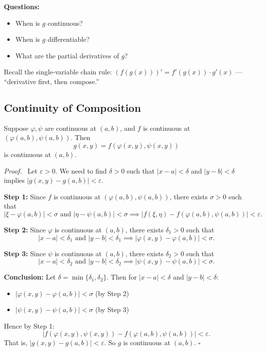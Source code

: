 \documentclass[11pt]{report}
\renewenvironment{proof}[1][Proof]{\par\noindent\textit{#1.}\ }{\hfill$\square$\par\medskip}
\begin{document}
\textbf{Questions:}
\begin{itemize}[itemsep=2pt]
    \item When is $g$ continuous?
    \item When is $g$ differentiable?
    \item What are the partial derivatives of $g$?
\end{itemize}

Recall the single-variable chain rule: $(f(g(x)))' = f'(g(x)) \cdot g'(x)$ — ``derivative first, then compose.''

\subsection*{Continuity of Composition}

\begin{theorem}
Suppose $\varphi, \psi$ are continuous at $(a, b)$, and $f$ is continuous at $(\varphi(a,b), \psi(a,b))$. Then 
\[
g(x,y) = f(\varphi(x,y), \psi(x,y))
\]
is continuous at $(a, b)$.
\end{theorem}

\begin{proof}
Let $\varepsilon > 0$. We need to find $\delta > 0$ such that $|x - a| < \delta$ and $|y - b| < \delta$ implies $|g(x,y) - g(a,b)| < \varepsilon$.

\textbf{Step 1:} Since $f$ is continuous at $(\varphi(a,b), \psi(a,b))$, there exists $\sigma > 0$ such that
\[
|\xi - \varphi(a,b)| < \sigma \text{ and } |\eta - \psi(a,b)| < \sigma \implies |f(\xi, \eta) - f(\varphi(a,b), \psi(a,b))| < \varepsilon.
\]

\textbf{Step 2:} Since $\varphi$ is continuous at $(a,b)$, there exists $\delta_1 > 0$ such that
\[
|x - a| < \delta_1 \text{ and } |y - b| < \delta_1 \implies |\varphi(x,y) - \varphi(a,b)| < \sigma.
\]

\textbf{Step 3:} Since $\psi$ is continuous at $(a,b)$, there exists $\delta_2 > 0$ such that
\[
|x - a| < \delta_2 \text{ and } |y - b| < \delta_2 \implies |\psi(x,y) - \psi(a,b)| < \sigma.
\]

\textbf{Conclusion:} Let $\delta = \min\{\delta_1, \delta_2\}$. Then for $|x - a| < \delta$ and $|y - b| < \delta$:
\begin{itemize}[itemsep=2pt]
    \item $|\varphi(x,y) - \varphi(a,b)| < \sigma$ (by Step 2)
    \item $|\psi(x,y) - \psi(a,b)| < \sigma$ (by Step 3)
\end{itemize}
Hence by Step 1:
\[
|f(\varphi(x,y), \psi(x,y)) - f(\varphi(a,b), \psi(a,b))| < \varepsilon.
\]
That is, $|g(x,y) - g(a,b)| < \varepsilon$. So $g$ is continuous at $(a,b)$.
\end{proof}
\end{document}
